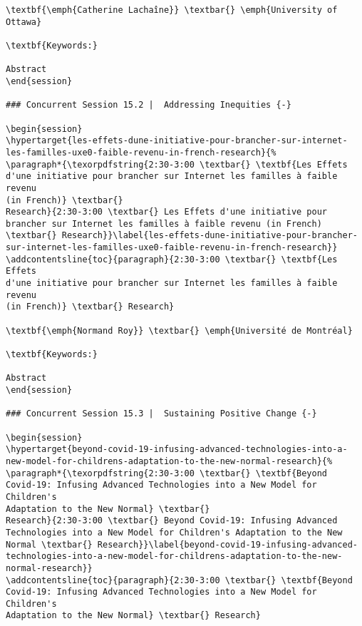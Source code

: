 \documentclass[
]{book}
\begin{document}
\begin{verbatim}
\textbf{\emph{Catherine Lachaîne}} \textbar{} \emph{University of
Ottawa}

\textbf{Keywords:}

Abstract
\end{session}

### Concurrent Session 15.2 |  Addressing Inequities {-}

\begin{session}
\hypertarget{les-effets-dune-initiative-pour-brancher-sur-internet-les-familles-uxe0-faible-revenu-in-french-research}{%
\paragraph*{\texorpdfstring{2:30-3:00 \textbar{} \textbf{Les Effets
d'une initiative pour brancher sur Internet les familles à faible revenu
(in French)} \textbar{}
Research}{2:30-3:00 \textbar{} Les Effets d'une initiative pour brancher sur Internet les familles à faible revenu (in French) \textbar{} Research}}\label{les-effets-dune-initiative-pour-brancher-sur-internet-les-familles-uxe0-faible-revenu-in-french-research}}
\addcontentsline{toc}{paragraph}{2:30-3:00 \textbar{} \textbf{Les Effets
d'une initiative pour brancher sur Internet les familles à faible revenu
(in French)} \textbar{} Research}

\textbf{\emph{Normand Roy}} \textbar{} \emph{Université de Montréal}

\textbf{Keywords:}

Abstract
\end{session}

### Concurrent Session 15.3 |  Sustaining Positive Change {-}

\begin{session}
\hypertarget{beyond-covid-19-infusing-advanced-technologies-into-a-new-model-for-childrens-adaptation-to-the-new-normal-research}{%
\paragraph*{\texorpdfstring{2:30-3:00 \textbar{} \textbf{Beyond
Covid-19: Infusing Advanced Technologies into a New Model for Children's
Adaptation to the New Normal} \textbar{}
Research}{2:30-3:00 \textbar{} Beyond Covid-19: Infusing Advanced Technologies into a New Model for Children's Adaptation to the New Normal \textbar{} Research}}\label{beyond-covid-19-infusing-advanced-technologies-into-a-new-model-for-childrens-adaptation-to-the-new-normal-research}}
\addcontentsline{toc}{paragraph}{2:30-3:00 \textbar{} \textbf{Beyond
Covid-19: Infusing Advanced Technologies into a New Model for Children's
Adaptation to the New Normal} \textbar{} Research}


\end{verbatim}
\end{document}
